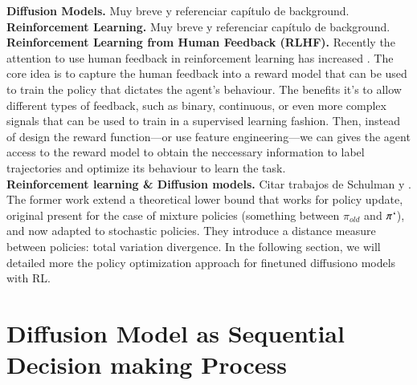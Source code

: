 \noindent\textbf{Diffusion Models.} Muy breve y referenciar capítulo de background.\\

\noindent\textbf{Reinforcement Learning.} Muy breve y referenciar capítulo de background.\\

\noindent\textbf{Reinforcement Learning from Human Feedback (RLHF).} Recently the attention to use human feedback in reinforcement learning has increased \cite{kaufmann2023survey}. The core idea is to capture the human feedback into a reward model that can be used to train the policy that dictates the agent's behaviour. The benefits it's to allow different types of feedback, such as binary, continuous, or even more complex signals that can be used to train in a supervised learning fashion. Then, instead of design the reward function---or use feature engineering---we can gives the agent access to the reward model to obtain the neccessary information to label trajectories and optimize its behaviour to learn the task. \\

\noindent\textbf{Reinforcement learning \& Diffusion models.} Citar trabajos de Schulman \citep{schulman2015trust} y \citep{schulman2017proximal}. The former work extend a theoretical lower bound that works for policy update, original present for the case of mixture policies (something between $\pi_{old}$ and $\pi`$), and now adapted to stochastic policies. They introduce a distance measure between policies: total variation divergence. In the following section, we will detailed more the policy optimization approach for finetuned diffusiono models with RL.\\

\section{Diffusion Model as Sequential Decision making Process}\label{sec:diffusion-model-mdp}

